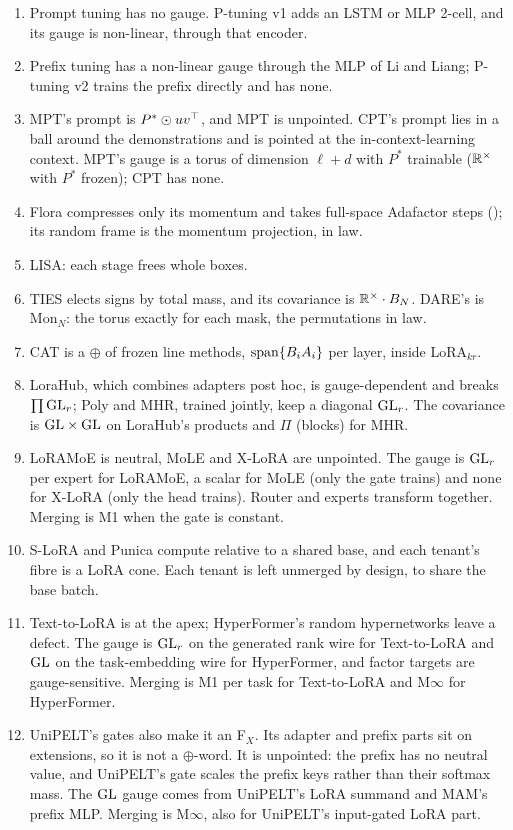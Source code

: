 {\begin{enumerate}[label={\sffamily\bfseries\color{tide}\arabic*},leftmargin=1.6em,itemsep=1pt,topsep=3pt]
  LoReFT is neutral iff $W=R$ and $b=0$. The catalogue key for its gauge is $\GL$.
  \item Prompt tuning has no gauge. P-tuning v1 adds an LSTM or MLP 2-cell, and its gauge is non-linear, through that
  encoder.
  \item Prefix tuning has a non-linear gauge through the MLP of Li and Liang; P-tuning v2 trains the prefix directly and
  has none.
  \item MPT's prompt is $P^*\odot uv^{\top}$, and MPT is unpointed. CPT's prompt lies in a ball around the demonstrations and
  is pointed at the in-context-learning context. MPT's gauge is a torus of dimension $\ell+d$ with $P^*$ trainable
  ($\mathbb{R}^\times$ with $P^*$ frozen); CPT has none.
  \item Flora compresses only its momentum and takes full-space Adafactor steps (); its random
  frame is the momentum projection, in law.
  \item LISA: each stage frees whole boxes.
  \item TIES elects signs by total mass, and its covariance is $\mathbb{R}^\times\cdot B_N$. DARE's is $\mathrm{Mon}_N$: the
  torus exactly for each mask, the permutations in law.
  \item CAT is a $\oplus$ of frozen line methods, $\operatorname{span}\{B_iA_i\}$ per layer, inside LoRA$_{kr}$.
  \item LoraHub, which combines adapters post hoc, is gauge-dependent and breaks $\prod\mathrm{GL}_r$; Poly and MHR, trained
  jointly, keep a diagonal $\mathrm{GL}_r$. The covariance is $\mathrm{GL}\times\mathrm{GL}$ on LoraHub's products and $\Pi$ (blocks) for MHR.
  \item LoRAMoE is neutral, MoLE and X-LoRA are unpointed. The gauge is $\mathrm{GL}_r$ per expert for LoRAMoE, a scalar for
  MoLE (only the gate trains) and none for X-LoRA (only the head trains). Router and experts transform together.
  Merging is M1 when the gate is constant.
  \item S-LoRA and Punica compute relative to a shared base, and each tenant's fibre is a LoRA cone. Each tenant is
  left unmerged by design, to share the base batch.
  \item Text-to-LoRA is at the apex; HyperFormer's random hypernetworks leave a defect. The gauge is $\mathrm{GL}_r$ on the
  generated rank wire for Text-to-LoRA and $\GL$ on the task-embedding wire for HyperFormer, and factor targets are
  gauge-sensitive. Merging is M1 per task for Text-to-LoRA and M$\infty$ for HyperFormer.
  \item UniPELT's gates also make it an F$_X$. Its adapter and prefix parts sit on extensions, so it is not a
  $\oplus$-word. It is unpointed: the prefix has no neutral value, and UniPELT's gate scales the prefix keys rather
  than their softmax mass. The $\GL$ gauge comes from UniPELT's LoRA summand and MAM's prefix MLP. Merging is M$\infty$,
  also for UniPELT's input-gated LoRA part.
\end{enumerate}}

